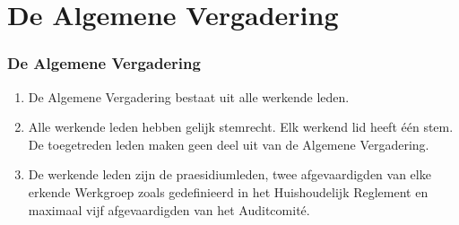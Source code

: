 

\part{De Algemene Vergadering}

    \section{De Algemene Vergadering}
    \begin{enumerate}
    \item De Algemene Vergadering bestaat uit alle werkende leden.
    \item Alle werkende leden hebben gelijk stemrecht. Elk werkend lid heeft één stem. De toegetreden leden maken geen deel uit van de Algemene Vergadering.
        \item De werkende leden zijn de praesidiumleden, twee afgevaardigden van elke erkende Werkgroep zoals gedefinieerd in het Huishoudelijk Reglement en maximaal vijf afgevaardigden van het Auditcomité.
    \end{enumerate}
    
